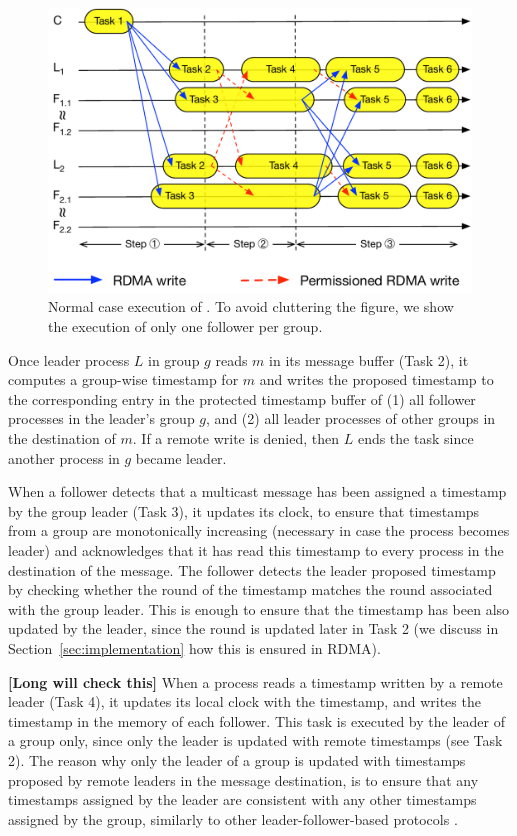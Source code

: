 \begin{figure}[ht!]
  \centering
  \includegraphics[width=1\linewidth]{figures/execution}
  \caption{Normal case execution of \libname. To avoid cluttering the figure, we show the execution of only one follower per group.}
  \label{fig:normal_operation_time}
\end{figure}

Once leader process $L$ in group $g$ reads $m$ in its message buffer (Task 2), it computes a
group-wise timestamp for $m$ and writes the proposed timestamp to the corresponding entry
in the protected timestamp buffer of (1) all follower processes in the leader's group $g$, and (2) all leader processes 
of other groups in the destination of $m$.
If a remote write is denied, then $L$ ends the task since another process in $g$ became leader.

When a follower detects that a multicast message has been assigned a timestamp by the group leader (Task 3), it updates its clock, to ensure that timestamps from a group are monotonically increasing (necessary in case the process becomes leader) and acknowledges that it has read this timestamp to every process in the destination of the message.
The follower detects the leader proposed timestamp by checking whether the round of the timestamp matches the round associated with the group leader. 
This is enough to ensure that the timestamp has been also updated by the leader, since the round is updated later in Task 2 (we discuss in Section~\ref{sec:implementation} how this is ensured in RDMA).

\textbf{[Long will check this]} When a process reads a timestamp written by a remote leader (Task 4), it updates its local clock with the timestamp, and writes the timestamp in the memory of each follower.
This task is executed by the leader of a group only, since only the leader is updated with remote timestamps (see Task 2).
The reason why only the leader of a group is updated with timestamps proposed by remote leaders in the message destination, is to ensure that any timestamps assigned by the leader are consistent with any other timestamps assigned by the group, similarly to other leader-follower-based protocols \cite{gotsman2019white, Junqueira2011}.

